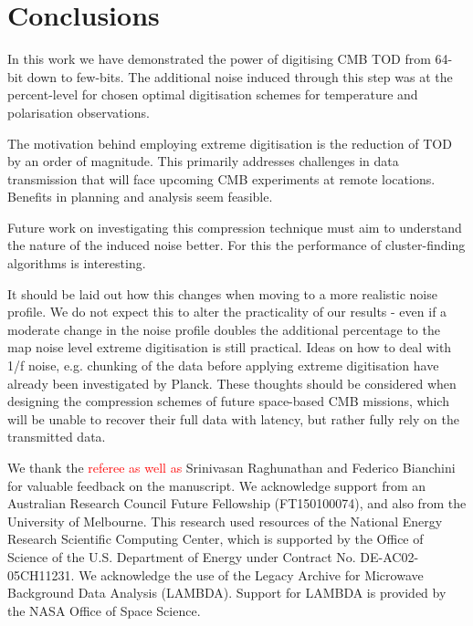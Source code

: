 \documentclass[apj]{emulateapj}
\newcommand{\changed}[1]{\textcolor{Red}{#1}}
\begin{document}
\section{Conclusions}
\label{sec:conclusions}

In this work we have demonstrated the power of digitising CMB TOD from 64-bit down to few-bits. The additional noise induced through this step was at the percent-level for chosen optimal digitisation schemes for temperature and polarisation observations.

The motivation behind employing extreme digitisation is the reduction of TOD by an order of magnitude. This primarily addresses challenges in data transmission that will face upcoming CMB experiments at remote locations. Benefits in planning and analysis seem feasible.

Future work on investigating this compression technique must aim to understand the nature of the induced noise better. For this the performance of cluster-finding algorithms is interesting.

It should be laid out how this changes when moving to a more realistic noise profile. We do not expect this to alter the practicality of our results - even if a moderate change in the noise profile doubles the additional percentage to the map noise level extreme digitisation is still practical. Ideas on how to deal with 1/f noise, e.g. chunking of the data before applying extreme digitisation have already been investigated by Planck. These thoughts should be considered when designing the compression schemes of future space-based CMB missions, which will be unable to recover their full data with latency, but rather fully rely on the transmitted data.

\acknowledgments %

We thank the \changed{referee as well as} Srinivasan Raghunathan and Federico Bianchini for valuable feedback on the manuscript. 
We acknowledge support from an Australian Research Council Future Fellowship (FT150100074), and also from the University of Melbourne. 
This research used resources of the National Energy Research Scientific Computing Center, which is supported by the Office of Science of the U.S. Department of Energy under Contract No. DE-AC02-05CH11231. 
We acknowledge the use of the Legacy Archive for Microwave Background Data Analysis (LAMBDA). Support for LAMBDA is provided by the NASA Office of Space Science.



\end{document}
